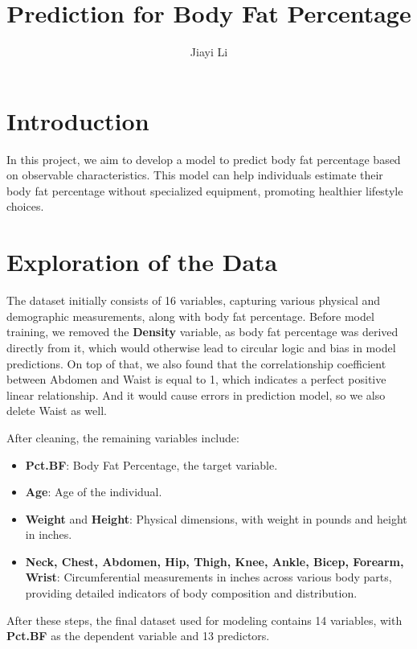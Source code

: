 \documentclass[8pt,twocolumn,twoside]{pnas-new}
\title{Prediction for Body Fat Percentage}
\author[a]{Jiayi Li}
\begin{document}
\maketitle

\thispagestyle{firststyle}

\section*{Introduction}
In this project, we aim to develop a model to predict body fat percentage based on observable characteristics. This model can help individuals estimate their body fat percentage without specialized equipment, promoting healthier lifestyle choices.

\section*{Exploration of the Data}
The dataset initially consists of 16 variables, capturing various physical and demographic measurements, along with body fat percentage. Before model training, we removed the \textbf{Density} variable, as body fat percentage was derived directly from it, which would otherwise lead to circular logic and bias in model predictions. On top of that, we also found that the correlationship coefficient between Abdomen and Waist is equal to 1, which indicates a perfect positive linear relationship. And it would cause errors in prediction model, so we also delete Waist as well.

After cleaning, the remaining variables include:

\begin{itemize}
    \item \textbf{Pct.BF}: Body Fat Percentage, the target variable.
    \item \textbf{Age}: Age of the individual.
    \item \textbf{Weight} and \textbf{Height}: Physical dimensions, with weight in pounds and height in inches.
    \item \textbf{Neck, Chest, Abdomen, Hip, Thigh, Knee, Ankle, Bicep, Forearm, Wrist}: Circumferential measurements in inches across various body parts, providing detailed indicators of body composition and distribution.
\end{itemize}

After these steps, the final dataset used for modeling contains 14 variables, with \textbf{Pct.BF} as the dependent variable and 13 predictors.
\end{document}
